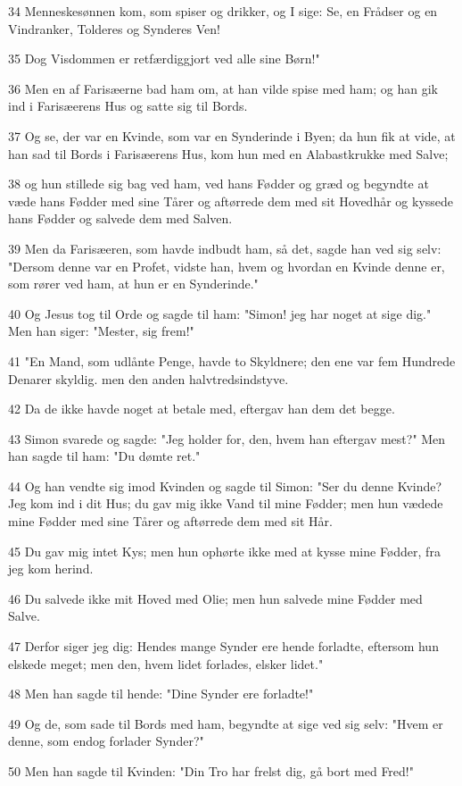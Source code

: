 \par 34 Menneskesønnen kom, som spiser og drikker, og I sige: Se, en Frådser og en Vindranker, Tolderes og Synderes Ven!
\par 35 Dog Visdommen er retfærdiggjort ved alle sine Børn!"
\par 36 Men en af Farisæerne bad ham om, at han vilde spise med ham; og han gik ind i Farisæerens Hus og satte sig til Bords.
\par 37 Og se, der var en Kvinde, som var en Synderinde i Byen; da hun fik at vide, at han sad til Bords i Farisæerens Hus, kom hun med en Alabastkrukke med Salve;
\par 38 og hun stillede sig bag ved ham, ved hans Fødder og græd og begyndte at væde hans Fødder med sine Tårer og aftørrede dem med sit Hovedhår og kyssede hans Fødder og salvede dem med Salven.
\par 39 Men da Farisæeren, som havde indbudt ham, så det, sagde han ved sig selv: "Dersom denne var en Profet, vidste han, hvem og hvordan en Kvinde denne er, som rører ved ham, at hun er en Synderinde."
\par 40 Og Jesus tog til Orde og sagde til ham: "Simon! jeg har noget at sige dig." Men han siger: "Mester, sig frem!"
\par 41 "En Mand, som udlånte Penge, havde to Skyldnere; den ene var fem Hundrede Denarer skyldig. men den anden halvtredsindstyve.
\par 42 Da de ikke havde noget at betale med, eftergav han dem det begge.
\par 43 Simon svarede og sagde: "Jeg holder for, den, hvem han eftergav mest?" Men han sagde til ham: "Du dømte ret."
\par 44 Og han vendte sig imod Kvinden og sagde til Simon: "Ser du denne Kvinde? Jeg kom ind i dit Hus; du gav mig ikke Vand til mine Fødder; men hun vædede mine Fødder med sine Tårer og aftørrede dem med sit Hår.
\par 45 Du gav mig intet Kys; men hun ophørte ikke med at kysse mine Fødder, fra jeg kom herind.
\par 46 Du salvede ikke mit Hoved med Olie; men hun salvede mine Fødder med Salve.
\par 47 Derfor siger jeg dig: Hendes mange Synder ere hende forladte, eftersom hun elskede meget; men den, hvem lidet forlades, elsker lidet."
\par 48 Men han sagde til hende: "Dine Synder ere forladte!"
\par 49 Og de, som sade til Bords med ham, begyndte at sige ved sig selv: "Hvem er denne, som endog forlader Synder?"
\par 50 Men han sagde til Kvinden: "Din Tro har frelst dig, gå bort med Fred!"

